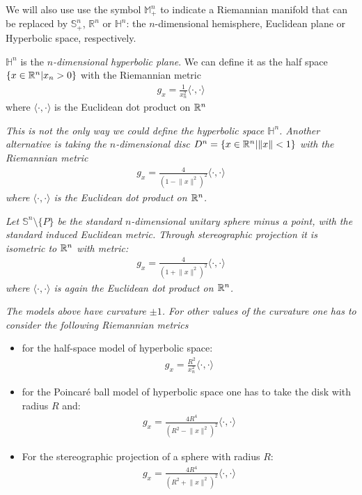 We will also use use the symbol $\mathbb{M}^n_+$ to indicate a Riemannian manifold that can be replaced by $\mathbb{S}^n_+$, $\mathbb{R}^n$ or $\mathbb{H}^n$: the $n$-dimensional hemisphere, Euclidean plane or Hyperbolic space, respectively.


\begin{defin}
	$\mathbb{H}^n$ is the {\em $n$-dimensional hyperbolic plane}. We can define it as the half space $\{x\in \mathbb{R}^n|x_n > 0\}$ with the Riemannian metric
	\begin{align*}
		g_x=\frac{1}{x_n^2} \langle\cdot, \cdot \rangle
	\end{align*}
	where $\langle\cdot, \cdot \rangle$ is the Euclidean dot product on $\mathbb{R}^n$
\end{defin}


\begin{oss}
	\em This is not the only way we could define the hyperbolic space $\mathbb{H}^n$. Another alternative is taking the $n$-dimensional disc $D^n = \{x\in \mathbb{R}^n|\lVert x \rVert  < 1 \}$ with the Riemannian metric 
	\begin{align*}
		g_x=\frac{4}{(1-\lVert x \rVert^2)^2} \langle\cdot, \cdot \rangle
	\end{align*}
	where $\langle\cdot, \cdot \rangle$ is the Euclidean dot product on $\mathbb{R}^n$.
\end{oss}

\begin{oss}
	\em Let $\mathbb{S}^n \setminus \{P\}$ be the standard $n$-dimensional unitary sphere minus a point, with the standard induced Euclidean metric. Through stereographic projection it is isometric to $\mathbb{R}^n$ with metric:
	\begin{align*}
		g_x=\frac{4}{(1+\lVert x \rVert^2)^2} \langle\cdot, \cdot \rangle
	\end{align*}
	where $\langle\cdot, \cdot \rangle$ is again the Euclidean dot product on $\mathbb{R}^n$.
\end{oss}


\begin{oss}
	\em The models above have curvature $\pm 1$. For other values of the curvature one has to consider the following Riemannian metrics
	\begin{itemize}
		\item for the half-space model of hyperbolic space:
		\begin{align*}
			g_x=\frac{R^2}{x_n^2} \langle\cdot, \cdot \rangle
		\end{align*}
		\item for the Poincaré ball model of hyperbolic space one has to take the disk with radius $R$ and:
		\begin{align*}
			g_x=\frac{4 R^4}{(R^2-\lVert x \rVert^2)^2} \langle\cdot, \cdot \rangle
		\end{align*}
		\item For the stereographic projection of a sphere with radius $R$:
		\begin{align*}
			g_x=\frac{4R^4}{(R^2+\lVert x \rVert^2)^2} \langle\cdot, \cdot \rangle
		\end{align*}
	\end{itemize}
\end{oss}

